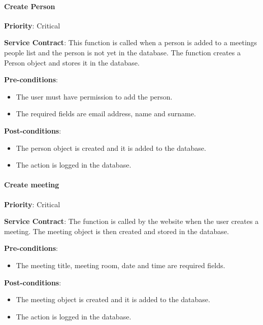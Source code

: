     \paragraph{Create Person}
			\begin{description}
			    \item{\textbf{Priority}:} Critical %
			    \item{\textbf{Service Contract}:} This function is called when a person is added to a meetings people list and the person is not yet in the database. The function creates a Person object and stores it in the database.
			    \item{\textbf{Pre-conditions}:}%
    			    \begin{itemize}
    			        \item The user must have permission to add the person.
    			        \item The required fields are email address, name and surname.
    			    \end{itemize}
			    \item{\textbf{Post-conditions}:} %
    			    \begin{itemize}
    			    \item The person object is created and it is added to the database.
    			    \item The action is logged in the database.
    			    \end{itemize}
			\end{description}
    

    \paragraph{Create meeting}
			\begin{description}
			    \item{\textbf{Priority}:} Critical%
			    \item{\textbf{Service Contract}:} The function is called by the website when the user creates a meeting. The meeting object is then created and stored in the database.%
			    \item{\textbf{Pre-conditions}:}%
    			    \begin{itemize}
    			        \item The meeting title, meeting room, date and time are required fields.
    			    \end{itemize}
			    \item{\textbf{Post-conditions}:} %
    			    \begin{itemize}
    			    \item The meeting object is created and it is added to the database.
    			    \item The action is logged in the database.
    			    \end{itemize}
			\end{description}
